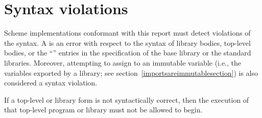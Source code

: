 \section{Syntax violations}

Scheme implementations conformant with this report must detect
violations of the syntax.  A  is an error
with respect to the syntax of library bodies, top-level bodies,
or the ``\exprtype'' entries in the
specification of the base library or the standard libraries.
Moreover, attempting to assign to an immutable variable (i.e., the
variables exported by a library; see
section~\ref{importsareimmutablesection}) is also
considered a syntax violation.

If a top-level or library form is not syntactically correct, then the
execution of that top-level program or library must not be allowed to begin.

